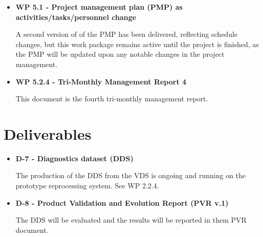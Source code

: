 \begin{itemize}
\item{\bf WP 5.1 - Project management plan (PMP) as activities/tasks/personnel change}

A second version of of the PMP has been delivered, reflecting schedule changes, but
this work package remains active until the project is finished, as the PMP will be
updated upon any notable changes in the project management.



\item{\bf WP 5.2.4 - Tri-Monthly Management Report 4}

This document is the fourth tri-monthly management report. 


\end{itemize}


\section{Deliverables}


\begin{itemize}


\item{\bf D-7 - Diagnostics dataset (DDS)}

The production of the DDS from the VDS is ongoing and running on the prototype reprocessing system. See WP 2.2.4.


\item{\bf D-8 - Product Validation and Evolution Report (PVR v.1)}

The DDS will be evaluated and the results will be reported in them PVR document.


\end{itemize}
